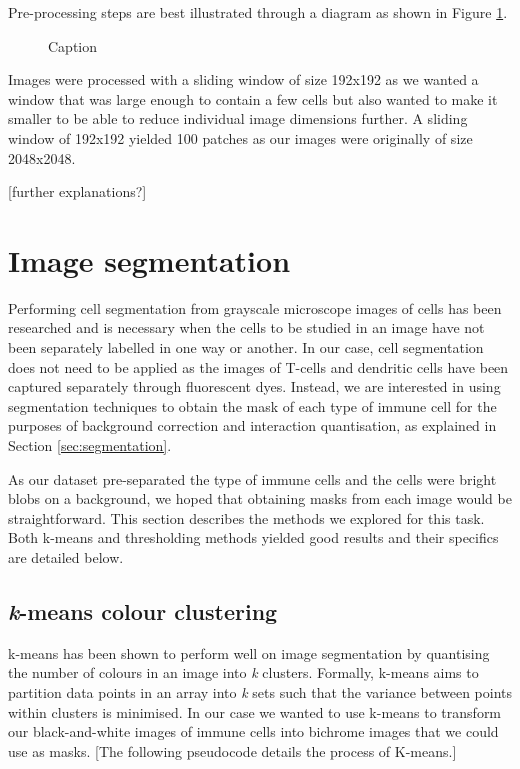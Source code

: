 Pre-processing steps are best illustrated through a diagram as shown in Figure \ref{fig:preprocessing}.

\begin{figure}[h]
    \centering
    \caption{Caption}
    \label{fig:preprocessing}
\end{figure}

Images were processed with a sliding window of size 192x192 as we wanted a window that was large enough to contain a few cells but also wanted to make it smaller to be able to reduce individual image dimensions further. A sliding window of 192x192 yielded 100 patches as our images were originally of size 2048x2048.

[further explanations?]

\section{Image segmentation}

Performing cell segmentation from grayscale microscope images of cells has been researched and is necessary when the cells to be studied in an image have not been separately labelled in one way or another. In our case, cell segmentation does not need to be applied as the images of T-cells and dendritic cells have been captured separately through fluorescent dyes. Instead, we are interested in using segmentation techniques to obtain the mask of each type of immune cell for the purposes of background correction and interaction quantisation, as explained in Section \ref{sec:segmentation}.

As our dataset pre-separated the type of immune cells and the cells were bright blobs on a background, we hoped that obtaining masks from each image would be straightforward. This section describes the methods we explored for this task. Both k-means and thresholding methods yielded good results and their specifics are detailed below.

\subsection{\textit{k}-means colour clustering}

k-means has been shown to perform well on image segmentation by quantising the number of colours in an image into \textit{k} clusters. Formally, k-means aims to partition data points in an array into \textit{k} sets such that the variance between points within clusters is minimised. In our case we wanted to use k-means to transform our black-and-white images of immune cells into bichrome images that we could use as masks. [The following pseudocode details the process of K-means.]

